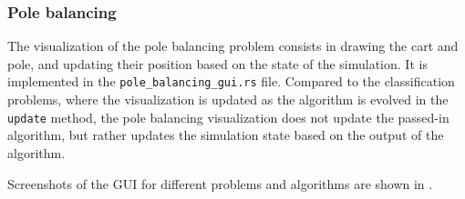 \subsubsection{Pole balancing}

The visualization of the pole balancing problem consists in drawing the cart and pole, and updating their position based on the state of the simulation.
It is implemented in the \texttt{pole\_balancing\_gui.rs} file. Compared to the classification problems, where the visualization is updated as the algorithm is evolved in the \texttt{update} method,
the pole balancing visualization does not update the passed-in algorithm, but rather updates the simulation state based on the output of the algorithm.

Screenshots of the GUI for different problems and algorithms are shown in .

